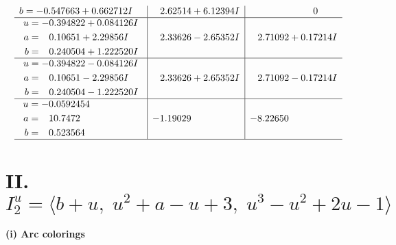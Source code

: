 \documentclass[1p]{elsarticle_modified}
\theoremstyle{definition}
\begin{document}
$$\begin{array}{c|c|c}
\begin{aligned}
b &= -0.547663 + 0.662712 I\end{aligned}
 & \phantom{-}2.62514 + 6.12394 I & \phantom{-0.000000 } 0 \\ \hline\begin{aligned}
u &= -0.394822 + 0.084126 I \\
a &= \phantom{-}0.10651 + 2.29856 I \\
b &= \phantom{-}0.240504 + 1.222520 I\end{aligned}
 & \phantom{-}2.33626 - 2.65352 I & \phantom{-}2.71092 + 0.17214 I \\ \hline\begin{aligned}
u &= -0.394822 - 0.084126 I \\
a &= \phantom{-}0.10651 - 2.29856 I \\
b &= \phantom{-}0.240504 - 1.222520 I\end{aligned}
 & \phantom{-}2.33626 + 2.65352 I & \phantom{-}2.71092 - 0.17214 I \\ \hline\begin{aligned}
u &= -0.0592454\phantom{ +0.000000I} \\
a &= \phantom{-}10.7472\phantom{ +0.000000I} \\
b &= \phantom{-}0.523564\phantom{ +0.000000I}\end{aligned}
 & -1.19029\phantom{ +0.000000I} & -8.22650\phantom{ +0.000000I}\\
 \hline 
 \end{array}$$\newpage\newpage\renewcommand{\arraystretch}{1}
\centering \section*{II. $I^u_{2}= \langle b+u,\;u^2+a- u+3,\;u^3- u^2+2 u-1 \rangle$}
\flushleft \textbf{(i) Arc colorings}\\
\end{document}
